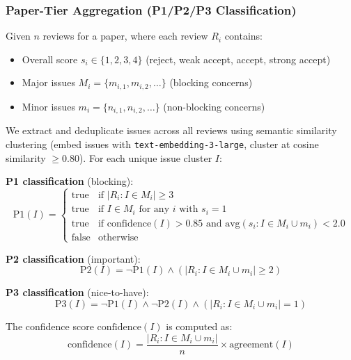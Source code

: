 \subsubsection{Paper-Tier Aggregation (P1/P2/P3 Classification)}

Given $n$ reviews for a paper, where each review $R_i$ contains:
\begin{itemize}
\item Overall score $s_i \in \{1, 2, 3, 4\}$ (reject, weak accept, accept, strong accept)
\item Major issues $M_i = \{m_{i,1}, m_{i,2}, \ldots\}$ (blocking concerns)
\item Minor issues $m_i = \{n_{i,1}, n_{i,2}, \ldots\}$ (non-blocking concerns)
\end{itemize}

We extract and deduplicate issues across all reviews using semantic similarity clustering (embed issues with \texttt{text-embedding-3-large}, cluster at cosine similarity $\geq 0.80$). For each unique issue cluster $I$:

\textbf{P1 classification} (blocking):
\begin{equation}
\text{P1}(I) = \begin{cases}
\text{true} & \text{if } |R_i : I \in M_i| \geq 3 \\
\text{true} & \text{if } I \in M_i \text{ for any } i \text{ with } s_i = 1 \\
\text{true} & \text{if } \text{confidence}(I) > 0.85 \text{ and avg}(s_i : I \in M_i \cup m_i) < 2.0 \\
\text{false} & \text{otherwise}
\end{cases}
\end{equation}

\textbf{P2 classification} (important):
\begin{equation}
\text{P2}(I) = \neg\text{P1}(I) \land \left( |R_i : I \in M_i \cup m_i| \geq 2 \right)
\end{equation}

\textbf{P3 classification} (nice-to-have):
\begin{equation}
\text{P3}(I) = \neg\text{P1}(I) \land \neg\text{P2}(I) \land \left( |R_i : I \in M_i \cup m_i| = 1 \right)
\end{equation}

The confidence score $\text{confidence}(I)$ is computed as:
\begin{equation}
\text{confidence}(I) = \frac{|R_i : I \in M_i \cup m_i|}{n} \times \text{agreement}(I)
\end{equation}

